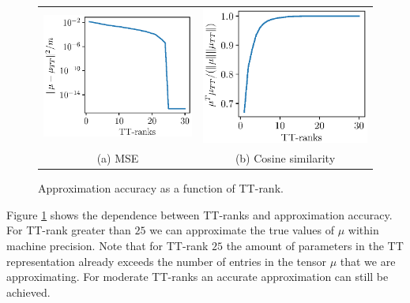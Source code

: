 \begin{figure}[!h]
  \vspace{-.3cm}
  \begin{center}
      \begin{tabular}{cc}
          \hspace{-0.3 cm}\includegraphics[width=0.5\linewidth]{pics/acc_vs_ranks.eps} &
          \hspace{-0.3 cm}\includegraphics[width=0.5\linewidth]{pics/cos_vs_ranks.eps} \\
          (a) MSE & 
          (b) Cosine similarity
      \end{tabular}
  \end{center}
  \caption{Approximation accuracy as a function of TT-rank.}
  \label{acc_vs_ranks}
\end{figure}

Figure \ref{acc_vs_ranks} shows the dependence between TT-ranks and 
approximation accuracy. For TT-rank greater than $25$ we can approximate the
true values of $\mu$ within machine precision. Note that for TT-rank $25$ the
amount of parameters in the TT representation already exceeds the number of
entries in the tensor $\mu$ that we are approximating. For moderate
TT-ranks an accurate approximation can still be achieved.

